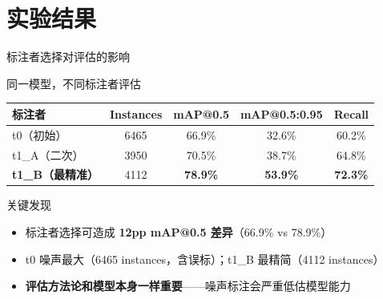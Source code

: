 \documentclass[aspectratio=169, 10pt]{beamer}
\begin{document}
\section{实验结果}

\begin{frame}{标注者选择对评估的影响}
  \begin{block}{同一模型，不同标注者评估}
    \begin{tabular}{lcccc}
      \toprule
      标注者 & Instances & mAP@0.5 & mAP@0.5:0.95 & Recall \\
      \midrule
      t0（初始） & 6465 & 66.9\% & 32.6\% & 60.2\% \\
      t1\_A（二次） & 3950 & 70.5\% & 38.7\% & 64.8\% \\
      \textbf{t1\_B（最精准）} & 4112 & \textbf{78.9\%} & \textbf{53.9\%} & \textbf{72.3\%} \\
      \bottomrule
    \end{tabular}
  \end{block}
  \vspace{0em}
  \begin{alertblock}{关键发现}
    \begin{itemize}
      \item 标注者选择可造成 \textbf{12pp mAP@0.5 差异}（66.9\% vs 78.9\%）
      \item t0 噪声最大（6465 instances，含误标）；t1\_B 最精简（4112 instances）
      \item \textbf{评估方法论和模型本身一样重要}——噪声标注会严重低估模型能力
    \end{itemize}
  \end{alertblock}
\end{frame}
\end{document}
